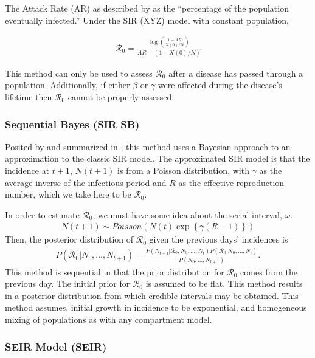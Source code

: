 \documentclass[12pt]{article}
\newcommand{\rr}{\ensuremath{\mathcal{R}_0}}
\begin{document}
The Attack Rate (AR) as described by \cite{obadia2012r0} as the ``percentage of the population eventually infected.''  Under the SIR (XYZ) model with constant population,

\begin{align}\label{r0_attackrate}
\rr =  \frac{\log \left (\frac{1  - AR}{X(0)/N}  \right ) }{AR - (1 - X(0)/N)}
\end{align}

This method can only be used to assess $\rr$ after a disease has passed through a population.  Additionally, if either $\beta$ or $\gamma$ were affected during the disease's lifetime then $\rr$ cannot be properly assessed.


\subsubsection{Sequential Bayes (SIR SB)}\label{sec:seqbayes}

Posited by \cite{bettencourt2008} and summarized in \cite{obadia2012r0}, this method uses a Bayesian approach to an approximation to the classic SIR model.  The approximated SIR model is that the incidence at $t+1$, $N(t+1)$ is from a Poisson distribution, with $\gamma$ as the  average inverse of the infectious period and $R$ as the effective reproduction number, which we take here to be $\rr$.

In order to estimate $\rr$, we must have some idea about the serial interval, $\omega$.
\begin{align*}
N(t+1)  \sim Poisson( N(t) \exp \left \{  \gamma (R-1)\right \})
\end{align*}
Then, the posterior distribution of $\rr$ given the previous days' incidences is
\begin{align*}
  P(\rr | N_0, \dots, N_{t+1}) = \frac{P(N_{t+1} | \rr, N_0, \dots, N_t)P(\rr| N_0, \dots, N_t)}{P(N_0, \dots, N_{t+1})}.
\end{align*}
This method is sequential in that the prior distribution for $\rr$ comes from the previous day.  The initial prior for $\rr$ is assumed to be flat.  This method results in a posterior distribution from which credible intervals may be obtained.  This method assumes, initial growth in incidence to be exponential, and homogeneous mixing of populations as with any compartment model.




\subsubsection{SEIR Model (SEIR)}
\label{sec:seir-model}
\end{document}
